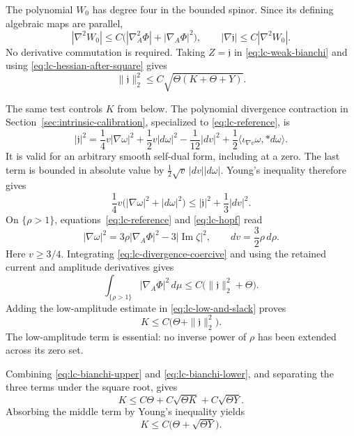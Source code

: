 The polynomial $W_0$ has degree four in the bounded spinor.  Since its
defining algebraic maps are parallel,
\[
 |\nabla^2W_0|\le C\bigl(|\nabla_A^2\Phi|+|\nabla_A\Phi|^2\bigr),
 \qquad |\nabla\mathfrak j|\le C|\nabla^2W_0|.
\]
No derivative commutation is required.  Taking $Z=\mathfrak j$ in
\eqref{eq:lc-weak-bianchi} and using
\eqref{eq:lc-hessian-after-square} gives
\begin{equation}\label{eq:lc-bianchi-upper}
 \|\mathfrak j\|_2^2\le C\sqrt{\Theta(K+\Theta+Y)}.
\end{equation}

The same test controls $K$ from below.  The polynomial divergence
contraction in Section~\ref{sec:intrinsic-calibration}, specialized
to \eqref{eq:lc-reference}, is
\begin{equation}\label{eq:lc-divergence-exact}
 |\mathfrak j|^2
 =\frac14v|\nabla\omega|^2+\frac12v|d\omega|^2
       -\frac1{12}|dv|^2
       +\frac12\langle\iota_{\nabla v}\omega,*d\omega\rangle.
\end{equation}
It is valid for an arbitrary smooth self-dual form, including at a
zero.  The last term is bounded in absolute value by
$\tfrac12\sqrt v\,|dv||d\omega|$.  Young's inequality therefore gives
\begin{equation}\label{eq:lc-divergence-coercive}
 \frac14v\bigl(|\nabla\omega|^2+|d\omega|^2\bigr)
 \le|\mathfrak j|^2+\frac13|dv|^2.
\end{equation}
On $\{\rho>1\}$, equations~\eqref{eq:lc-reference} and
\eqref{eq:lc-hopf} read
\[
 |\nabla\omega|^2=3\rho|\nabla_A\Phi|^2
                         -3|\operatorname{Im}\zeta|^2,
 \qquad dv=\frac32\rho\,d\rho.
\]
Here $v\ge3/4$.  Integrating \eqref{eq:lc-divergence-coercive} and
using the retained current and amplitude derivatives gives
\[
 \int_{\{\rho>1\}}|\nabla_A\Phi|^2\,d\mu
 \le C\bigl(\|\mathfrak j\|_2^2+\Theta\bigr).
\]
Adding the low-amplitude estimate in
\eqref{eq:lc-low-and-slack} proves
\begin{equation}\label{eq:lc-bianchi-lower}
 K\le C\bigl(\Theta+\|\mathfrak j\|_2^2\bigr).
\end{equation}
The low-amplitude term is essential: no inverse power of $\rho$ has
been extended across its zero set.

Combining \eqref{eq:lc-bianchi-upper} and
\eqref{eq:lc-bianchi-lower}, and separating the three terms under
the square root, gives
\[
 K\le C\Theta+C\sqrt{\Theta K}+C\sqrt{\Theta Y}.
\]
Absorbing the middle term by Young's inequality yields
\begin{equation}\label{eq:lc-K-closed}
 K\le C\bigl(\Theta+\sqrt{\Theta Y}\bigr).
\end{equation}

